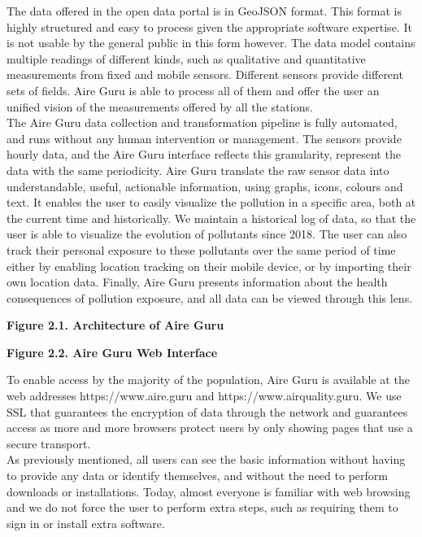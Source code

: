 The data offered in the open data portal is in GeoJSON format.
This format is highly structured and easy to process given the appropriate software expertise. It is not usable by the general public in this form however.
The data model contains multiple readings of different kinds, such as qualitative and quantitative measurements from fixed and mobile sensors.
Different sensors provide different sets of fields.
Aire Guru is able to process all of them and offer the user an unified vision of the measurements offered by all the stations.\\

The Aire Guru data collection and transformation pipeline is fully automated, and runs without any human intervention or management.
The sensors provide hourly data, and the Aire Guru interface reflects this granularity, represent the data with the same periodicity.
Aire Guru translate the raw sensor data into understandable, useful, actionable information, using graphs, icons, colours and text. 
It enables the user to easily visualize the pollution in a specific area, both at the current time and historically. We maintain
a historical log of data, so that the user is able to visualize the evolution of pollutants since 2018. The user can also track their personal exposure
to these pollutants over the same period of time either by enabling location tracking on their mobile device, or by importing their own location
data. Finally, Aire Guru presents information about the health consequences of pollution exposure, and all data can be viewed through this lens.\\

\begin{center}
    \bf Figure 2.1. Architecture of Aire Guru\\
\end{center}

\begin{center}
    \bf Figure 2.2. Aire Guru Web Interface\\
\end{center}

To enable access by the majority of the population, Aire Guru is available at the web addresses https://www.aire.guru and https://www.airquality.guru.
We use SSL that guarantees the encryption of data through the network and guarantees access as more and more browsers protect 
users by only showing pages that use a secure transport.\\

As previously mentioned, all users can see the basic information without having to provide any data or identify themselves, and without the need to
perform downloads or installations. Today, almost everyone is familiar with web browsing and we do not force the user to perform extra steps, such as 
requiring them to sign in or install extra software.\\

